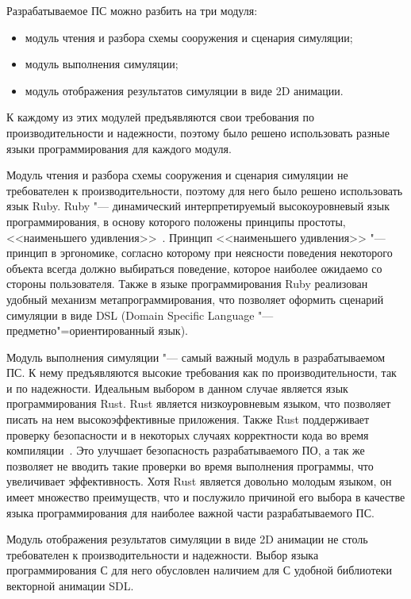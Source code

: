 Разрабатываемое ПС можно разбить на три модуля:
\begin{itemize}
  \item модуль чтения и разбора схемы сооружения и сценария симуляции;
  \item модуль выполнения симуляции;
  \item модуль отображения результатов симуляции в виде 2D анимации.
\end{itemize}

К каждому из этих модулей предъявляются свои требования по производительности и надежности, поэтому было решено использовать разные языки программирования для каждого модуля.

Модуль чтения и разбора схемы сооружения и сценария симуляции не требователен к производительности, поэтому для него было решено использовать язык Ruby.
Ruby "--- динамический интерпретируемый высокоуровневый язык программирования, в основу которого положены принципы простоты, <<наименьшего удивления>>~\cite{ruby_main}.
Принцип <<наименьшего удивления>> "--- принцип в эргономике, согласно которому при неясности поведения некоторого объекта всегда должно выбираться поведение,
которое наиболее ожидаемо со стороны пользователя.
Также в языке программирования Ruby реализован удобный механизм метапрограммирования, что позволяет оформить сценарий симуляции в виде DSL (Domain Specific Language "--- предметно"=ориентированный язык).

Модуль выполнения симуляции "--- самый важный модуль в разрабатываемом ПС. К нему предъявляются высокие требования как по производительности, так и по надежности.
Идеальным выбором в данном случае является язык программирования Rust. Rust является низкоуровневым языком, что позволяет писать на нем высокоэффективные приложения.
Также Rust поддерживает проверку безопасности и в некоторых случаях корректности кода во время компиляции~\cite{rust_main}.
Это улучшает безопасность разрабатываемого ПО, а так же позволяет не вводить такие проверки во время выполнения программы, что увеличивает эффективность.
Хотя Rust является довольно молодым языком, он имеет множество преимуществ, что и послужило причиной его выбора в качестве языка программирования для наиболее важной части разрабатываемого ПС.

Модуль отображения результатов симуляции в виде 2D анимации не столь требователен к производительности и надежности.
Выбор языка программирования С для него обусловлен наличием для С удобной библиотеки векторной анимации SDL.
